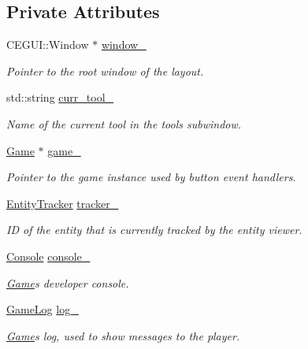 \subsection*{Private Attributes}
\begin{DoxyCompactItemize}
\item 
C\+E\+G\+U\+I\+::\+Window $\ast$ \hyperlink{class_g_u_i_a1216023a7675f2d5c6f3a33d6f2b9eca}{window\+\_\+}
\begin{DoxyCompactList}\small\item\em Pointer to the root window of the layout. \end{DoxyCompactList}\item 
std\+::string \hyperlink{class_g_u_i_a8ee9091320921548eca2305ec60d5182}{curr\+\_\+tool\+\_\+}
\begin{DoxyCompactList}\small\item\em Name of the current tool in the tools subwindow. \end{DoxyCompactList}\item 
\hyperlink{class_game}{Game} $\ast$ \hyperlink{class_g_u_i_a8af61511961fc5de258e1fd8e03eeed4}{game\+\_\+}
\begin{DoxyCompactList}\small\item\em Pointer to the game instance used by button event handlers. \end{DoxyCompactList}\item 
\hyperlink{class_entity_tracker}{Entity\+Tracker} \hyperlink{class_g_u_i_a90c490c7ff853531ac635f08408d59bf}{tracker\+\_\+}
\begin{DoxyCompactList}\small\item\em ID of the entity that is currently tracked by the entity viewer. \end{DoxyCompactList}\item 
\hyperlink{class_console}{Console} \hyperlink{class_g_u_i_aa16bd75eb28be973d2df6480cc65c68b}{console\+\_\+}
\begin{DoxyCompactList}\small\item\em \hyperlink{class_game}{Game}\textquotesingle{}s developer console. \end{DoxyCompactList}\item 
\hyperlink{class_game_log}{Game\+Log} \hyperlink{class_g_u_i_a2290d6a10a481beaa55dd93913ceadaf}{log\+\_\+}
\begin{DoxyCompactList}\small\item\em \hyperlink{class_game}{Game}\textquotesingle{}s log, used to show messages to the player. \end{DoxyCompactList}\item 

\end{DoxyCompactItemize}
